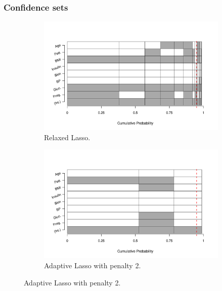 \documentclass{beamer}
\begin{document}
\begin{frame}
  \frametitle{Confidence sets}
  \begin{figure}[t]
  \centering
  \captionsetup{width=.9\linewidth}
  
  \begin{subfigure}{.5\textwidth}
    \centering
    \includegraphics[scale=0.25]{conf_set_elector=ms_lasso.pdf}
    \caption{{\footnotesize Relaxed Lasso.}}
    \label{fig:ms_relaxed}
  \end{subfigure}%
  \begin{subfigure}{.5\textwidth}
    \centering
    \includegraphics[scale=0.25]{conf_set_elector=ms_adaptive_pen_exp=2.pdf}
    \caption{{\footnotesize Adaptive Lasso with penalty 2.}}
    \label{fig:ms_adaptive_pen_exp=2}
  \end{subfigure}
  

\end{figure}
\end{frame}
\end{document}
